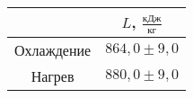 \begin{tabular}{cc}
\toprule
 & $L$, $\tfrac{кДж}{кг}$ \\
\midrule
Охлаждение & $864,0 \pm 9,0$ \\
Нагрев & $880,0 \pm 9,0$ \\
\bottomrule
\end{tabular}
